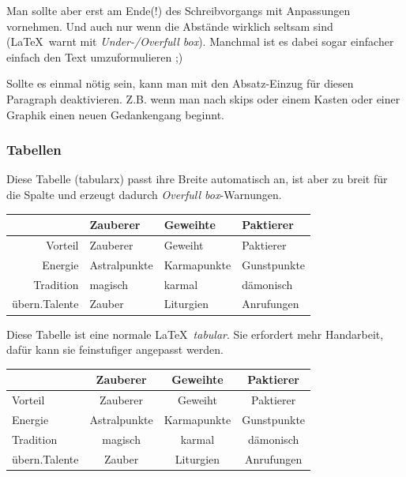 \begin{multicols}{2}[        %
		]
Man sollte aber erst am Ende(!) des Schreibvorgangs mit  Anpassungen vornehmen. Und auch nur wenn die Abstände wirklich seltsam sind (\LaTeX\ warnt mit \emph{Under-/Overfull box}). Manchmal ist es dabei sogar einfacher einfach den Text umzuformulieren ;)

Sollte es einmal nötig sein, kann man mit  den Absatz-Einzug für diesen Paragraph deaktivieren. Z.B. wenn man nach skips oder einem Kasten oder einer Graphik einen neuen Gedankengang beginnt.


\subsubsection{Tabellen}
Diese Tabelle (tabularx) passt ihre Breite automatisch an, ist aber zu breit für die Spalte und erzeugt dadurch \emph{Overfull box}-Warnungen.

\begin{tabularx}{\linewidth}{rXXX}
			  & \textbf{Zauberer} & \textbf{Geweihte} & \textbf{Paktierer} \\
	\hline
	Vorteil	  & Zauberer	 & Geweiht	   & Paktierer \\   
	Energie	  & Astralpunkte & Karmapunkte & Gunstpunkte \\ 
	Tradition & magisch	     & karmal	   & dämonisch \\   
übern.Talente & Zauber	     & Liturgien   & Anrufungen \\  
\end{tabularx}

\bigskip
\noindent Diese Tabelle ist eine normale \LaTeX\ \emph{tabular}. Sie erfordert mehr Handarbeit, dafür kann sie feinstufiger angepasst werden.


\begin{tabular}{l@{ }c@{\ }c@{\ }c}
			  & \textbf{Zauberer} & \textbf{Geweihte} & \textbf{Paktierer} \\
	\hline
	Vorteil	  & Zauberer	 & Geweiht	   & Paktierer \\
	Energie	  & Astralpunkte & Karmapunkte & Gunstpunkte \\
	Tradition & magisch	     & karmal	   & dämonisch \\
übern.Talente & Zauber	     & Liturgien   & Anrufungen \\
\end{tabular}
\end{multicols}

\vfill

